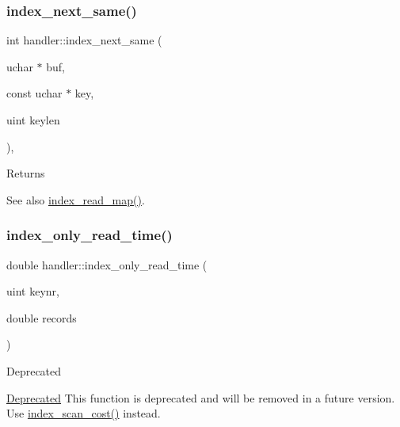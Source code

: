 \mbox{\label{classhandler_a5459b92420f74e6f88dec137e1941d22}} 
\subsubsection{\texorpdfstring{index\+\_\+next\+\_\+same()}{index\_next\_same()}}
{\footnotesize\ttfamily int handler\+::index\+\_\+next\+\_\+same (\begin{DoxyParamCaption}\item[{uchar $\ast$}]{buf,  }\item[{const uchar $\ast$}]{key,  }\item[{uint}]{keylen }\end{DoxyParamCaption})\hspace{0.3cm}{\ttfamily [protected]}, {\ttfamily [virtual]}}

\begin{DoxyReturn}{Returns}

\end{DoxyReturn}
\begin{DoxySeeAlso}{See also}
\mbox{\hyperlink{classhandler_af8c2b258691e5baac8dd22d19c084b37}{index\+\_\+read\+\_\+map()}}. 
\end{DoxySeeAlso}
\mbox{\label{classhandler_a4a2ac6b2908a899c0ce230818bb7a993}} 
\subsubsection{\texorpdfstring{index\+\_\+only\+\_\+read\+\_\+time()}{index\_only\_read\_time()}}
{\footnotesize\ttfamily double handler\+::index\+\_\+only\+\_\+read\+\_\+time (\begin{DoxyParamCaption}\item[{uint}]{keynr,  }\item[{double}]{records }\end{DoxyParamCaption})\hspace{0.3cm}{\ttfamily [virtual]}}

\begin{DoxyRefDesc}{Deprecated}
\item[\mbox{\hyperlink{deprecated__deprecated000003}{Deprecated}}]This function is deprecated and will be removed in a future version. Use \mbox{\hyperlink{classhandler_a5575d58c0acbb1924f7f3d3eb756612a}{index\+\_\+scan\+\_\+cost()}} instead. \end{DoxyRefDesc}



